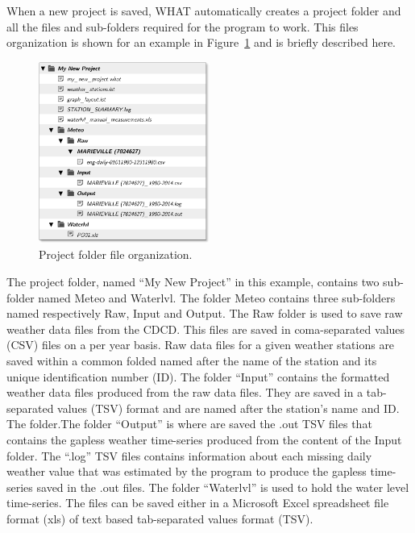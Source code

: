 \documentclass[12pt, letterpaper, fleqn]{report}
\begin{document}
When a new project is saved, WHAT automatically creates a project folder and all the files and sub-folders required for the program to work. This files organization is shown for an example in Figure~\ref{fig:proFolder_organization} and is briefly described here.

\begin{figure}[h!]
\centering
\includegraphics[width=0.5\textwidth]{file_and_folder_architecture}
\caption[Project folder file organization.]{Project folder file organization.}
\label{fig:proFolder_organization}
\end{figure}

The project folder, named ``My New Project'' in this example, contains two sub-folder named Meteo and Waterlvl. The folder Meteo contains three sub-folders named respectively Raw, Input and Output. The Raw folder is used to save raw weather data files from the CDCD. This files are saved in coma-separated values (CSV) files on a per year basis. Raw data files for a given weather stations are saved within a common folded named after the name of the station and its unique identification number (ID). The folder ``Input'' contains the formatted weather data files produced from the raw data files. They are saved in a tab-separated values (TSV) format and are named after the station's name and ID. The folder.The folder ``Output'' is where are saved the .out TSV files that contains the gapless weather time-series produced from the content of the Input folder. The ``.log'' TSV files contains information about each missing daily weather value that was estimated by the program to produce the gapless time-series saved in the .out files. The folder ``Waterlvl'' is used to hold the water level time-series. The files can be  saved either in a Microsoft Excel spreadsheet file format (xls) of text based tab-separated values format (TSV).
\end{document}
